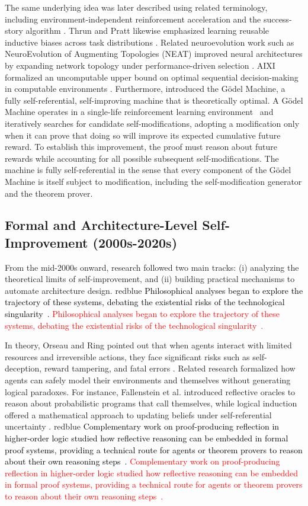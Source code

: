 \documentclass{article}
\let\oldtextcolor\textcolor
\renewcommand{\textcolor}[2]{
  \def\temp{#1}
  \def\red{blue}
  \ifx\temp\red
    \oldtextcolor{black}{#2}
  \else
    \oldtextcolor{#1}{#2}
  \fi
}
\begin{document}
The same underlying idea was later described using related terminology, including environment-independent reinforcement acceleration and the success-story algorithm \citep{DBLP:conf/icml/WieringS96, schmidhuber1996simple, schmidhuber1996multi, schmidhuber1997shifting}. Thrun and Pratt likewise emphasized learning reusable inductive biases across task distributions \citep{thrun1998learning}. Related neuroevolution work such as NeuroEvolution of Augmenting Topologies (NEAT) improved neural architectures by expanding network topology under performance-driven selection \citep{stanley2002evolving}. AIXI formalized an uncomputable upper bound on optimal sequential decision-making in computable environments \citep{hutter2000theoryuniversalartificialintelligence}. Furthermore, \citet{schmidhuber2003godel} introduced the G\"odel Machine, a fully self-referential, self-improving machine that is theoretically optimal. A G\"odel Machine operates in a single-life reinforcement learning environment~\citep{Schmidhuber1994OnLH} and iteratively searches for candidate self-modifications, adopting a modification only when it can prove that doing so will improve its expected cumulative future reward. To establish this improvement, the proof must reason about future rewards while accounting for all possible subsequent self-modifications. The machine is fully self-referential in the sense that every component of the G\"odel Machine is itself subject to modification, including the self-modification generator and the theorem prover.


\subsection{Formal and Architecture-Level Self-Improvement (2000s-2020s)}

From the mid-2000s onward, research followed two main tracks: (i) analyzing the theoretical limits of self-improvement, and (ii) building practical mechanisms to automate architecture design. \textcolor{red}{Philosophical analyses began to explore the trajectory of these systems, debating the existential risks of the technological singularity~\citep{subramanian2010science}.}
In theory, Orseau and Ring pointed out that when agents interact with limited resources and irreversible actions, they face significant risks such as self-deception, reward tampering, and fatal errors \citep{orseau2011self}. Related research formalized how agents can safely model their environments and themselves without generating logical paradoxes. For instance, Fallenstein et al. \citep{fallenstein2015reflectiveoraclesfoundationclassical} introduced reflective oracles to reason about probabilistic programs that call themselves,  while logical induction offered a mathematical approach to updating beliefs under self-referential uncertainty \citep{garrabrant2016logical}. \textcolor{red}{Complementary work on proof-producing reflection in higher-order logic studied how reflective reasoning can be embedded in formal proof systems, providing a technical route for agents or theorem provers to reason about their own reasoning steps~\citep{fallenstein2015proof}.} 
\end{document}
